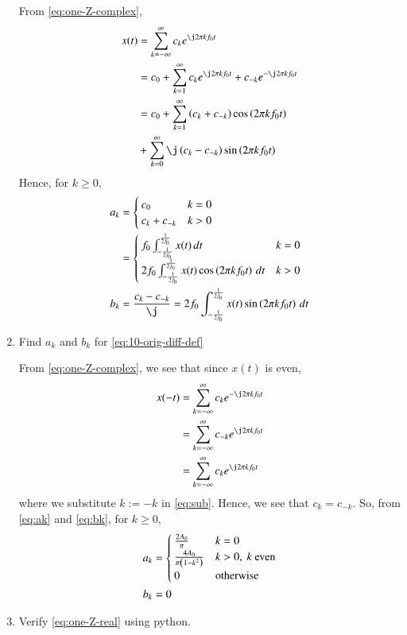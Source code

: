 \documentclass[journal,12pt,twocolumn]{IEEEtran}
\renewcommand\thesection{\arabic{section}}
\begin{document}
\begin{enumerate}[label=\thesection.\arabic*,ref=\thesection.\theenumi]
\solution From \eqref{eq:one-Z-complex},
\begin{align}
    x(t) &= \sum_{k = -\infty}^{\infty}c_ke^{\j2\pi kf_0 t} \\
         &= c_0 + \sum_{k = 1}^{\infty}c_ke^{\j2\pi kf_0t} + c_{-k}e^{-\j2\pi kf_0t} \\
         &= c_0 + \sum_{k = 1}^{\infty}\brak{c_k + c_{-k}}\cos\brak{2\pi kf_0t}  \nonumber \\
         &+ \sum_{k = 0}^{\infty}\j\brak{c_k - c_{-k}}\sin\brak{2\pi kf_0t}
\end{align}
Hence, for $k \ge 0$,
\begin{align}
    a_k &= 
    \begin{cases}
        c_0 & k = 0 \\
        c_k + c_{-k} & k > 0
    \end{cases} \label{eq:ak} \\
        &=
    \begin{cases}
        f_0\int_{-\frac{1}{2f_0}}^{\frac{1}{2f_0}}x(t)\, dt & k = 0 \\
        2f_0\int_{-\frac{1}{2f_0}}^{\frac{1}{2f_0}}
        x(t)\cos\brak{2\pi kf_0t}\, dt & k > 0
    \end{cases} \\
    b_k &= \frac{c_k - c_{-k}}{\j} = 2f_0\int_{-\frac{1}{2f_0}}^{\frac{1}{2f_0}}
    x(t)\sin\brak{2\pi kf_0t}\, dt
    \label{eq:bk}
\end{align}
\item Find $a_k$ and $b_k$ for 
	\eqref{eq:10-orig-diff-def}

\solution From \eqref{eq:one-Z-complex}, we see that since $x(t)$ is even,
\begin{align}
    x(-t) &= \sum_{k = -\infty}^{\infty}c_ke^{-\j2\pi kf_0 t} \\
          &= \sum_{k = -\infty}^{\infty}c_{-k}e^{\j2\pi kf_0t} \label{eq:sub} \\
          &= \sum_{k = -\infty}^{\infty}c_ke^{\j2\pi kf_0 t}
\end{align}
where we substitute $k := -k$ in \eqref{eq:sub}. Hence, we see that 
$c_k = c_{-k}$. So, from \eqref{eq:ak} and \eqref{eq:bk}, for $k \ge 0$,
\begin{align}
    a_k &= 
    \begin{cases}
        \frac{2A_0}{\pi} & k = 0 \\
        \frac{4A_0}{\pi\left(1 - k^2\right)} & k > 0,\ k\ \text{even} \\
        0 & \text{otherwise}
    \end{cases} \label{eq:ak-xt}\\
    b_k &= 0
    \label{eq:bk-xt}
\end{align}
\item Verify 
\eqref{eq:one-Z-real}
using python.


\end{enumerate}
\end{document}
